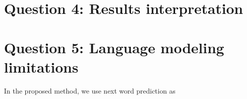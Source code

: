 \documentclass[a4paper]{article}
\begin{document}
\section{Question 4: Results interpretation}



\section{Question 5: Language modeling limitations}
In the proposed method, we use next word prediction as 


\end{document}
